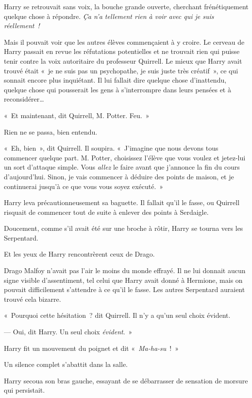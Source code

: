 Harry se retrouvait sans voix, la bouche grande ouverte, cherchant frénétiquement quelque chose à répondre.
\emph{Ça n'a tellement rien à voir avec qui je suis réellement~!}

Mais il pouvait voir que les autres élèves commençaient à y croire.
Le cerveau de Harry passait en revue les réfutations potentielles et ne trouvait rien qui puisse tenir contre la voix autoritaire du professeur Quirrell.
Le mieux que Harry avait trouvé était «~je ne suis pas un psychopathe, je suis juste très créatif~», ce qui sonnait encore plus inquiétant.
Il lui fallait dire quelque chose d'inattendu, quelque chose qui pousserait les gens à s'interrompre dans leurs pensées et à reconsidérer…

«~Et maintenant, dit Quirrell, M. Potter. Feu.~»

Rien ne se passa, bien entendu.

«~Eh, bien~», dit Quirrell. Il soupira.
«~J'imagine que nous devons tous commencer quelque part.
M. Potter, choisissez l'élève que vous voulez et jetez-lui un sort d'attaque simple.
Vous \emph{allez} le faire avant que j'annonce la fin du cours d'aujourd'hui.
Sinon, je vais commencer à déduire des points de maison, et je continuerai jusqu'à ce que vous vous soyez exécuté.~»

Harry leva précautionneusement sa baguette.
Il fallait qu'il le fasse, ou Quirrell risquait de commencer tout de suite à enlever des points à Serdaigle.

Doucement, comme s'il avait été sur une broche à rôtir, Harry se tourna vers les Serpentard.

Et les yeux de Harry rencontrèrent ceux de Drago.

Drago Malfoy n'avait pas l'air le moins du monde effrayé.
Il ne lui donnait aucun signe visible d'assentiment, tel celui que Harry avait donné à Hermione, mais on pouvait difficilement s'attendre à ce qu'il le fasse.
Les autres Serpentard auraient trouvé cela bizarre.

«~Pourquoi cette hésitation~? dit Quirrell. Il n'y a qu'un seul choix évident.

--- Oui, dit Harry. Un seul choix \emph{évident}.~»

Harry fit un mouvement du poignet et dit «~\emph{Ma-ha-su}~!~»

Un silence complet s'abattit dans la salle.

Harry secoua son bras gauche, essayant de se débarrasser de sensation de morsure qui persistait.

